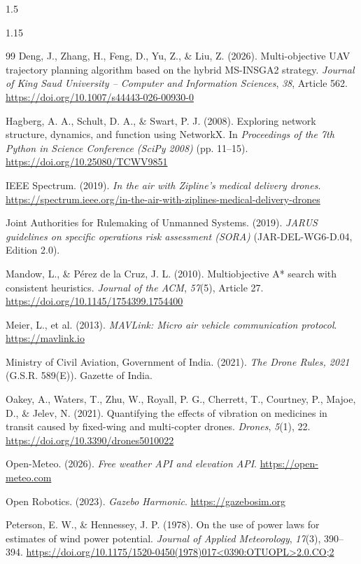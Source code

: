 \documentclass[a4paper, 14pt, oneside]{Thesis}
\begin{document}
\begin{spacing}{1.5}
\begin{spacing}{1.15}
\begin{thebibliography}{99}
Deng, J., Zhang, H., Feng, D., Yu, Z., \& Liu, Z. (2026). Multi-objective UAV trajectory planning algorithm based on the hybrid MS-INSGA2 strategy. \textit{Journal of King Saud University -- Computer and Information Sciences}, \textit{38}, Article 562. \url{https://doi.org/10.1007/s44443-026-00930-0}

Hagberg, A. A., Schult, D. A., \& Swart, P. J. (2008). Exploring network structure, dynamics, and function using NetworkX. In \textit{Proceedings of the 7th Python in Science Conference (SciPy 2008)} (pp. 11--15). \url{https://doi.org/10.25080/TCWV9851}

IEEE Spectrum. (2019). \textit{In the air with Zipline's medical delivery drones}. \url{https://spectrum.ieee.org/in-the-air-with-ziplines-medical-delivery-drones}

Joint Authorities for Rulemaking of Unmanned Systems. (2019). \textit{JARUS guidelines on specific operations risk assessment (SORA)} (JAR-DEL-WG6-D.04, Edition 2.0).

Mandow, L., \& P\'{e}rez de la Cruz, J. L. (2010). Multiobjective A* search with consistent heuristics. \textit{Journal of the ACM}, \textit{57}(5), Article 27. \url{https://doi.org/10.1145/1754399.1754400}

Meier, L., et al. (2013). \textit{MAVLink: Micro air vehicle communication protocol}. \url{https://mavlink.io}

Ministry of Civil Aviation, Government of India. (2021). \textit{The Drone Rules, 2021} (G.S.R. 589(E)). Gazette of India.

Oakey, A., Waters, T., Zhu, W., Royall, P. G., Cherrett, T., Courtney, P., Majoe, D., \& Jelev, N. (2021). Quantifying the effects of vibration on medicines in transit caused by fixed-wing and multi-copter drones. \textit{Drones}, \textit{5}(1), 22. \url{https://doi.org/10.3390/drones5010022}

Open-Meteo. (2026). \textit{Free weather API and elevation API}. \url{https://open-meteo.com}

Open Robotics. (2023). \textit{Gazebo Harmonic}. \url{https://gazebosim.org}

Peterson, E. W., \& Hennessey, J. P. (1978). On the use of power laws for estimates of wind power potential. \textit{Journal of Applied Meteorology}, \textit{17}(3), 390--394. \url{https://doi.org/10.1175/1520-0450(1978)017<0390:OTUOPL>2.0.CO;2}


\end{thebibliography}
\end{spacing}
\end{spacing}
\end{document}
